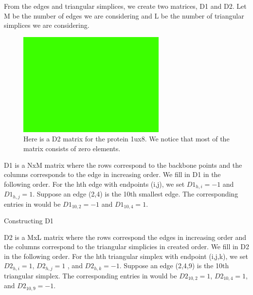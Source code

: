 \documentclass[12pt, a4paper, twocolumn, fullpage]{article}
\theoremstyle{plain}
\theoremstyle{definition}
\theoremstyle{remark}
\begin{document}
From the edges and triangular simplices, we create two matrices, D1 and D2. Let M be the number of edges we are considering and L be the number of triangular simplices we are considering.

\begin{figure}[t]
    \includegraphics[width=\linewidth]{img/blank.png}
    \caption{Here is a D2 matrix for the protein 1ux8. We notice that most of the matrix consists of zero elements. }
    \label{D2Mat}
\end{figure}


D1 is a  NxM matrix where the rows correspond to the backbone points and the columns corresponds to the edge in increasing order. We fill in D1 in the following order. For the hth  edge with endpoints (i,j), we set $D1_{h,i} = -1$ and $D1_{h,j} = 1$. Suppose an edge (2,4) is the 10th smallest edge. The corresponding entries in would be $D1_{10,2}=-1$ and $D1_{10,4}=1$.

\begin{algorithm}
\caption{Constructing D1}
\begin{algorithmic}
\ENDFOR
\end{algorithmic}
\end{algorithm}

D2 is a MxL matrix where the rows correspond the edges in increasing order and the columns correspond to the triangular simplicies in created order. We fill in D2 in the following order. For the hth triangular simplex with endpoint (i,j,k), we set $D2_{h,i} = 1$, $D2_{h,j} = 1$ , and $D2_{h,k} = -1$. Suppose an edge (2,4,9) is the 10th triangular simplex. The corresponding entries in would be $D2_{10,2}=1$, $D2_{10,4}=1$, and $D2_{10,9}=-1$. 
\end{document}
